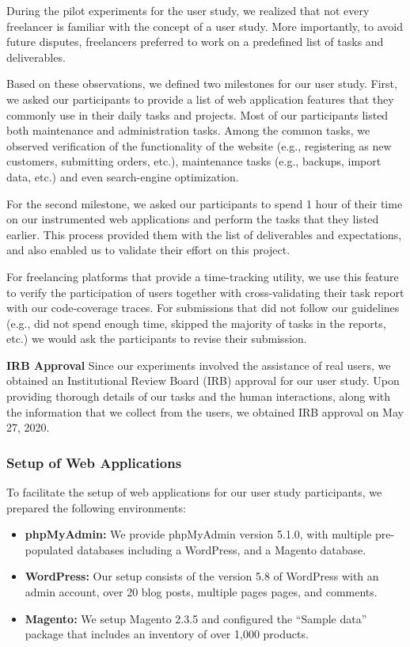 During the pilot experiments for the user study, we realized that not every freelancer is familiar with the concept of a user study. 
More importantly, to avoid future disputes, freelancers preferred to work on a predefined list of tasks and deliverables. 

Based on these observations, we defined two milestones for our user study. 
First, we asked our participants to provide a list of web application features that they commonly use in their daily tasks and projects. 
Most of our participants listed both maintenance and administration tasks. 
Among the common tasks, we observed verification of the functionality of the website (e.g., registering as new customers, submitting orders, etc.), maintenance tasks (e.g., backups, import data, etc.) and even search-engine optimization. 

For the second milestone, we asked our participants to spend 1 hour of their time on our instrumented web applications and perform the tasks that they listed earlier. 
This process provided them with the list of deliverables and expectations, and also enabled us to validate their effort on this project. 

For freelancing platforms that provide a time-tracking utility, we use this feature to verify the participation of users together with cross-validating their task report with our code-coverage traces. 
For submissions that did not follow our guidelines (e.g., did not spend enough time, skipped the majority of tasks in the reports, etc.) we would ask the participants to revise their submission. 

\textbf{IRB Approval} Since our experiments involved the assistance of real users, we obtained an Institutional Review Board (IRB) approval for our user study. 
Upon providing thorough details of our tasks and the human interactions, along with the information that we collect from the users, we obtained IRB approval on May 27, 2020. 

\subsubsection{Setup of Web Applications}

To facilitate the setup of web applications for our user study participants, we prepared the following environments:

\begin{itemize}
    \item \textbf{phpMyAdmin:} We provide phpMyAdmin version 5.1.0, with multiple pre-populated databases including a WordPress, and a Magento database.
    \item \textbf{WordPress:} Our setup consists of the version 5.8 of WordPress with an admin account, over 20 blog posts, multiple pages pages, and comments. 
    \item \textbf{Magento:} We setup Magento 2.3.5 and configured the ``Sample data'' package that includes an inventory of over 1,000 products. 
\end{itemize}

